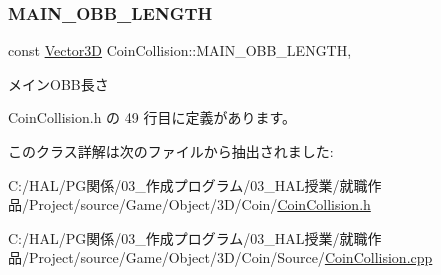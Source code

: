 \subsubsection{\texorpdfstring{M\+A\+I\+N\+\_\+\+O\+B\+B\+\_\+\+L\+E\+N\+G\+TH}{MAIN\_OBB\_LENGTH}}
{\footnotesize\ttfamily const \mbox{\hyperlink{class_vector3_d}{Vector3D}} Coin\+Collision\+::\+M\+A\+I\+N\+\_\+\+O\+B\+B\+\_\+\+L\+E\+N\+G\+TH\hspace{0.3cm}{\ttfamily [static]}, {\ttfamily [private]}}



メイン\+O\+B\+B長さ 



 Coin\+Collision.\+h の 49 行目に定義があります。



このクラス詳解は次のファイルから抽出されました\+:\begin{DoxyCompactItemize}
\item 
C\+:/\+H\+A\+L/\+P\+G関係/03\+\_\+作成プログラム/03\+\_\+\+H\+A\+L授業/就職作品/\+Project/source/\+Game/\+Object/3\+D/\+Coin/\mbox{\hyperlink{_coin_collision_8h}{Coin\+Collision.\+h}}\item 
C\+:/\+H\+A\+L/\+P\+G関係/03\+\_\+作成プログラム/03\+\_\+\+H\+A\+L授業/就職作品/\+Project/source/\+Game/\+Object/3\+D/\+Coin/\+Source/\mbox{\hyperlink{_coin_collision_8cpp}{Coin\+Collision.\+cpp}}\end{DoxyCompactItemize}
